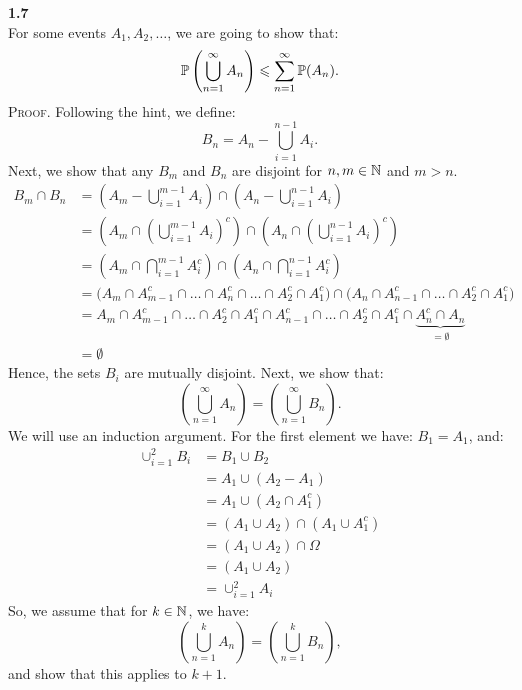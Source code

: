 \bigskip\noindent
\textbf{1.7}\\  %
For some events $A_1, A_2, \ldots$, we are going to show that:
$$
\P\left(\bigcup_{n=1}^\infty A_n\right) \leq \sum_{n=1}^\infty \P(A_n).
$$
\textsc{Proof}. Following the hint, we define:
$$
B_n = A_n - \bigcup_{i=1}^{n-1} A_i.
$$
Next, we show that any $B_m$ and $B_n$ are disjoint for $n,m\in\N$ and $m>n$.
\begin{align*}
    B_m\cap B_n &= \left(A_m - \bigcup_{i=1}^{m-1} A_i\right)\cap\left(A_n - \bigcup_{i=1}^{n-1} A_i\right) \\
    &= \left(A_m \cap\left(\bigcup_{i=1}^{m-1} A_i\right)^c\right)\cap\left(A_n \cap\left(\bigcup_{i=1}^{n-1} A_i\right)^c\right) \\
    &= \left(A_m \cap\bigcap_{i=1}^{m-1} A_i^c\right)\cap\left(A_n \cap\bigcap_{i=1}^{n-1} A_i^c\right) \\
    &= \Big(A_m\cap A_{m-1}^c\cap\ldots\cap A_n^c\cap\ldots\cap A_2^c\cap A_1^c\Big)\cap\Big(A_n\cap A_{n-1}^c\cap\ldots\cap A_2^c\cap A_1^c\Big)  \\
    &= A_m\cap A_{m-1}^c\cap\ldots\cap A_2^c\cap A_1^c\cap A_{n-1}^c\cap\ldots\cap A_2^c\cap A_1^c\cap 
    \underbrace{A_n^c\cap A_n}_{=\emptyset} \\
    &= \emptyset
\end{align*}
Hence, the sets $B_i$ are mutually disjoint. Next, we show that:
$$
\left(\bigcup_{n=1}^\infty A_n\right) = \left(\bigcup_{n=1}^\infty B_n\right).
$$
We will use an induction argument. For the first element we have: $B_1 = A_1$, and:
\begin{align*}
    \cup_{i=1}^2 B_i &= B_1\cup B_2 \\
    &= A_1\cup (A_2 - A_1) \\
    &= A_1\cup(A_2\cap A_1^c) \\
    &= (A_1\cup A_2)\cap(A_1\cup A_1^c) \\
    &= (A_1\cup A_2)\cap\Omega \\
    &= (A_1\cup A_2) \\
    &= \cup_{i=1}^2 A_i
\end{align*}
So, we assume that for $k\in\N$, we have:
$$
\left(\bigcup_{n=1}^k A_n\right) = \left(\bigcup_{n=1}^k B_n\right),
$$
and show that this applies to $k+1$.

